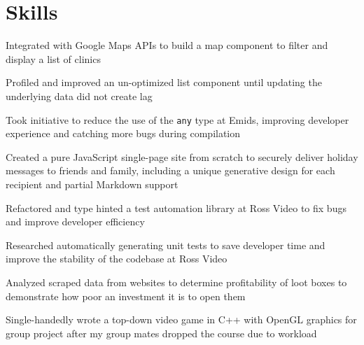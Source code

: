 \section{Skills}

\begin{bullets}
    \item Integrated with Google Maps APIs to build a map component to filter and display a list of clinics
    \item Profiled and improved an un-optimized list component until updating the underlying data did not create lag
    \item Took initiative to reduce the use of the \texttt{any} type at Emids, improving developer experience and catching more bugs during compilation
    \item Created a pure JavaScript single-page site from scratch to securely deliver holiday messages to friends and family, including a unique generative design for each recipient and partial Markdown support
\end{bullets}

\begin{bullets}
    \item Refactored and type hinted a test automation library at Ross Video to fix bugs and improve developer efficiency
    \item Researched automatically generating unit tests to save developer time and improve the stability of the codebase at Ross Video
    \item Analyzed scraped data from websites to determine profitability of loot boxes to demonstrate how poor an investment it is to open them
\end{bullets}


\begin{bullets}
    \item Single-handedly wrote a top-down video game in C++ with OpenGL graphics for group project after my group mates dropped the course due to workload
\end{bullets}

